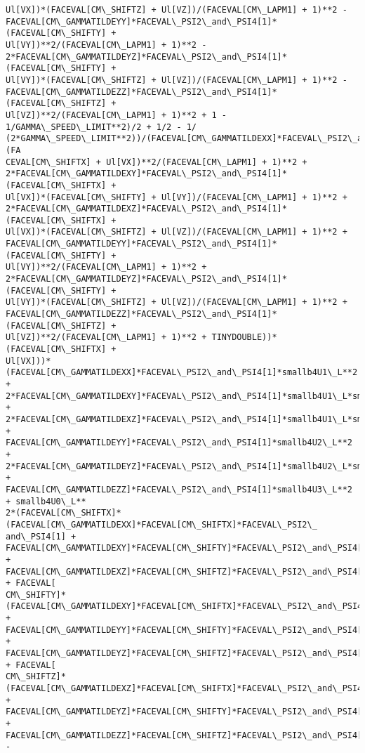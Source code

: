 \documentclass[landscape,letterpaper,10pt,english]{article}
\begin{document}
\begin{Verbatim}[commandchars=\\\{\}]
Ul[VX])*(FACEVAL[CM\_SHIFTZ] + Ul[VZ])/(FACEVAL[CM\_LAPM1] + 1)**2 -
FACEVAL[CM\_GAMMATILDEYY]*FACEVAL\_PSI2\_and\_PSI4[1]*(FACEVAL[CM\_SHIFTY] +
Ul[VY])**2/(FACEVAL[CM\_LAPM1] + 1)**2 -
2*FACEVAL[CM\_GAMMATILDEYZ]*FACEVAL\_PSI2\_and\_PSI4[1]*(FACEVAL[CM\_SHIFTY] +
Ul[VY])*(FACEVAL[CM\_SHIFTZ] + Ul[VZ])/(FACEVAL[CM\_LAPM1] + 1)**2 -
FACEVAL[CM\_GAMMATILDEZZ]*FACEVAL\_PSI2\_and\_PSI4[1]*(FACEVAL[CM\_SHIFTZ] +
Ul[VZ])**2/(FACEVAL[CM\_LAPM1] + 1)**2 + 1 - 1/GAMMA\_SPEED\_LIMIT**2)/2 + 1/2 - 1/
(2*GAMMA\_SPEED\_LIMIT**2))/(FACEVAL[CM\_GAMMATILDEXX]*FACEVAL\_PSI2\_and\_PSI4[1]*(FA
CEVAL[CM\_SHIFTX] + Ul[VX])**2/(FACEVAL[CM\_LAPM1] + 1)**2 +
2*FACEVAL[CM\_GAMMATILDEXY]*FACEVAL\_PSI2\_and\_PSI4[1]*(FACEVAL[CM\_SHIFTX] +
Ul[VX])*(FACEVAL[CM\_SHIFTY] + Ul[VY])/(FACEVAL[CM\_LAPM1] + 1)**2 +
2*FACEVAL[CM\_GAMMATILDEXZ]*FACEVAL\_PSI2\_and\_PSI4[1]*(FACEVAL[CM\_SHIFTX] +
Ul[VX])*(FACEVAL[CM\_SHIFTZ] + Ul[VZ])/(FACEVAL[CM\_LAPM1] + 1)**2 +
FACEVAL[CM\_GAMMATILDEYY]*FACEVAL\_PSI2\_and\_PSI4[1]*(FACEVAL[CM\_SHIFTY] +
Ul[VY])**2/(FACEVAL[CM\_LAPM1] + 1)**2 +
2*FACEVAL[CM\_GAMMATILDEYZ]*FACEVAL\_PSI2\_and\_PSI4[1]*(FACEVAL[CM\_SHIFTY] +
Ul[VY])*(FACEVAL[CM\_SHIFTZ] + Ul[VZ])/(FACEVAL[CM\_LAPM1] + 1)**2 +
FACEVAL[CM\_GAMMATILDEZZ]*FACEVAL\_PSI2\_and\_PSI4[1]*(FACEVAL[CM\_SHIFTZ] +
Ul[VZ])**2/(FACEVAL[CM\_LAPM1] + 1)**2 + TINYDOUBLE))*(FACEVAL[CM\_SHIFTX] +
Ul[VX]))*(FACEVAL[CM\_GAMMATILDEXX]*FACEVAL\_PSI2\_and\_PSI4[1]*smallb4U1\_L**2 +
2*FACEVAL[CM\_GAMMATILDEXY]*FACEVAL\_PSI2\_and\_PSI4[1]*smallb4U1\_L*smallb4U2\_L +
2*FACEVAL[CM\_GAMMATILDEXZ]*FACEVAL\_PSI2\_and\_PSI4[1]*smallb4U1\_L*smallb4U3\_L +
FACEVAL[CM\_GAMMATILDEYY]*FACEVAL\_PSI2\_and\_PSI4[1]*smallb4U2\_L**2 +
2*FACEVAL[CM\_GAMMATILDEYZ]*FACEVAL\_PSI2\_and\_PSI4[1]*smallb4U2\_L*smallb4U3\_L +
FACEVAL[CM\_GAMMATILDEZZ]*FACEVAL\_PSI2\_and\_PSI4[1]*smallb4U3\_L**2 + smallb4U0\_L**
2*(FACEVAL[CM\_SHIFTX]*(FACEVAL[CM\_GAMMATILDEXX]*FACEVAL[CM\_SHIFTX]*FACEVAL\_PSI2\_
and\_PSI4[1] +
FACEVAL[CM\_GAMMATILDEXY]*FACEVAL[CM\_SHIFTY]*FACEVAL\_PSI2\_and\_PSI4[1] +
FACEVAL[CM\_GAMMATILDEXZ]*FACEVAL[CM\_SHIFTZ]*FACEVAL\_PSI2\_and\_PSI4[1]) + FACEVAL[
CM\_SHIFTY]*(FACEVAL[CM\_GAMMATILDEXY]*FACEVAL[CM\_SHIFTX]*FACEVAL\_PSI2\_and\_PSI4[1]
+ FACEVAL[CM\_GAMMATILDEYY]*FACEVAL[CM\_SHIFTY]*FACEVAL\_PSI2\_and\_PSI4[1] +
FACEVAL[CM\_GAMMATILDEYZ]*FACEVAL[CM\_SHIFTZ]*FACEVAL\_PSI2\_and\_PSI4[1]) + FACEVAL[
CM\_SHIFTZ]*(FACEVAL[CM\_GAMMATILDEXZ]*FACEVAL[CM\_SHIFTX]*FACEVAL\_PSI2\_and\_PSI4[1]
+ FACEVAL[CM\_GAMMATILDEYZ]*FACEVAL[CM\_SHIFTY]*FACEVAL\_PSI2\_and\_PSI4[1] +
FACEVAL[CM\_GAMMATILDEZZ]*FACEVAL[CM\_SHIFTZ]*FACEVAL\_PSI2\_and\_PSI4[1]) -

\end{Verbatim}
\end{document}
